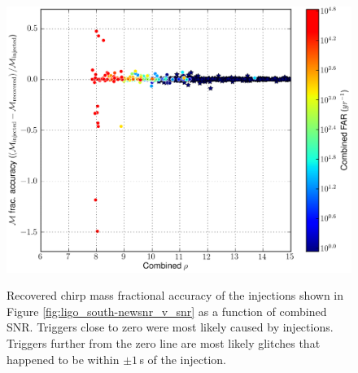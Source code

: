 \begin{figure}[p]
\center
\includegraphics[width=6in]{figures/ligo_south/H1L1-ligolw_cbc_plotfm_Non-Spinning_frac_accuracy_mathcalM_mathrminjected_0_3_F3_BNSLININJ+BNSLOGINJ+NSBHLININJ+NSBHLOGINJ+BBHLININJ+BBHLOGINJ_PLOTTED-961545543-3628944.png}
\label{fig:ligo_south-inj_mchirp_accuracy}
\caption{Recovered chirp mass fractional accuracy of the injections shown in
Figure \ref{fig:ligo_south-newsnr_v_snr} as a function of combined SNR.
Triggers close to zero were most likely caused by injections. Triggers further
from the zero line are most likely glitches that happened to be within $\pm
1\,$s of the injection.}
\end{figure}
